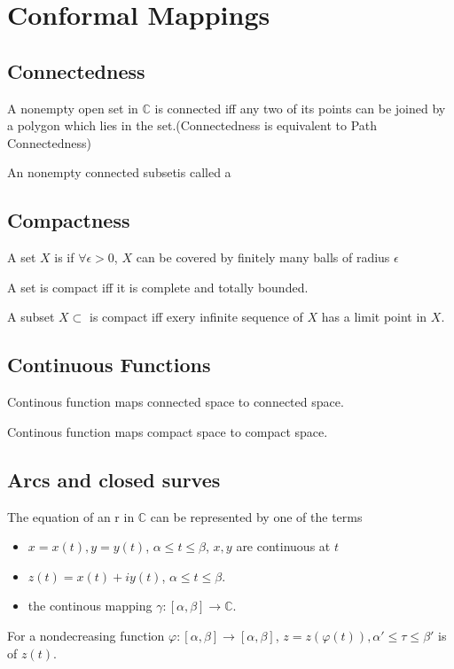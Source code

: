 \section{Conformal Mappings}

\subsection{Connectedness}
\begin{theorem}
    A nonempty open set in  $ \mathbb{C} $ is connected iff any two of its points can be joined by a polygon  which lies in the set.(\ie Connectedness is equivalent to Path Connectedness)
\end{theorem}
An nonempty connected subsetis called a 
\subsection{Compactness}
\begin{definition}
     A set  $ X  $ is  if  $ \forall \epsilon>0  $,  $ X  $ can be covered by finitely many balls of radius  $ \epsilon  $ 
     
\end{definition}
\begin{theorem}
    A set is compact iff it is complete and totally bounded.
 \end{theorem}
\begin{theorem}
    A subset  $ X\subset $ is compact iff exery infinite sequence of  $ X  $ has a limit point in  $ X  $.
\end{theorem}
\subsection{Continuous Functions}
\begin{theorem}
    Continous function maps connected space to connected space.
\end{theorem}
\begin{theorem}
    Continous function maps compact space to compact space.
\end{theorem}
\subsection[short]{Arcs and closed surves}
The equation of an  r in  $ \mathbb{C} $ can  be represented by one of the terms
\begin{itemize}
    \item  $ x=x(t),y=y(t) $, $ \alpha \leq t  \leq \beta$,  $ x,y $ are continuous at  $ t $
    \item  $ z(t)=x(t)+iy(t) $, $ \alpha \leq t \leq \beta $.
    \item the  continous mapping  $ \gamma:[\alpha,\beta]\rightarrow \mathbb{C} $. 
\end{itemize}
For a nondecreasing function  $ \varphi:[\alpha,\beta]\rightarrow[\alpha,\beta] $,  $ z=z(\varphi(t)),\alpha' \leq \tau \leq \beta' $ is   of  $ z(t) $.

